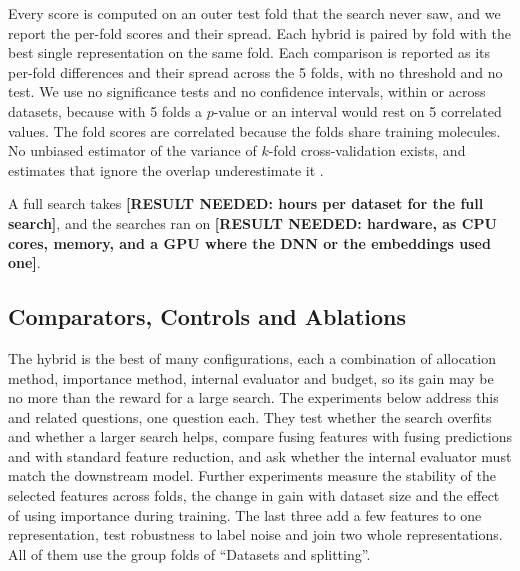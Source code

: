 Every score is computed on an outer test fold that the search never saw, and we report the per-fold scores and their spread. Each hybrid is paired by fold with the best single representation on the same fold. Each comparison is reported as its per-fold differences and their spread across the 5 folds, with no threshold and no test. We use no significance tests and no confidence intervals, within or across datasets, because with 5 folds a $p$-value or an interval would rest on 5 correlated values. The fold scores are correlated because the folds share training molecules. No unbiased estimator of the variance of $k$-fold cross-validation exists, and estimates that ignore the overlap underestimate it \citep{Bengio2004}.

A full search takes \textbf{[RESULT NEEDED: hours per dataset for the full search]}, and the searches ran on \textbf{[RESULT NEEDED: hardware, as CPU cores, memory, and a GPU where the DNN or the embeddings used one]}.


\subsection{Comparators, Controls and Ablations}

The hybrid is the best of many configurations, each a combination of allocation method, importance method, internal evaluator and budget, so its gain may be no more than the reward for a large search. The experiments below address this and related questions, one question each. They test whether the search overfits and whether a larger search helps, compare fusing features with fusing predictions and with standard feature reduction, and ask whether the internal evaluator must match the downstream model. Further experiments measure the stability of the selected features across folds, the change in gain with dataset size and the effect of using importance during training. The last three add a few features to one representation, test robustness to label noise and join two whole representations. All of them use the group folds of ``Datasets and splitting''.

